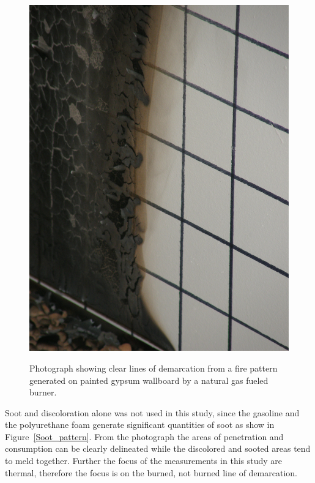 \documentclass[twoside]{uocthesis}
\begin{document}
\begin{figure}[p]
	\centering
	\includegraphics[width=\textwidth]{../Figures/demarcation}  \\
	\caption[Photograph showing clear lines of demarcation]{Photograph showing clear lines of demarcation from a fire pattern generated on painted gypsum wallboard by a natural gas fueled burner.}
	\label{demarcation}
\end{figure}

Soot and discoloration alone was not used in this study, since the gasoline and the polyurethane foam generate significant quantities of soot as show in Figure~\ref{Soot_pattern}.  From the photograph the areas of penetration and consumption can be clearly delineated while the discolored and sooted areas tend to meld together.  Further the focus of the measurements in this study are thermal, therefore the focus is on the burned, not burned line of demarcation.
\end{document}
